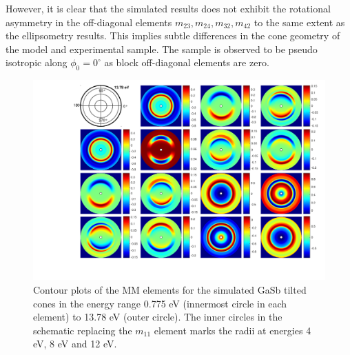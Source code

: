 However, it is clear that the simulated results does not exhibit the rotational asymmetry in the off-diagonal elements $m_{23}, m_{24}, m_{32}, m_{42}$ to the same extent as the ellipsometry results. This implies subtle differences in the cone geometry of the model and experimental sample. The sample is observed to be pseudo isotropic along $\phi_0=0^\circ$ as block off-diagonal elements are zero.

\begin{figure}
    \centering
    \includegraphics[width=\linewidth, trim=3.9cm 2.1cm 0.4cm 0cm, clip]{figures/ch4/gasb/contour/GaSbCones_contour_MM_13point78eV.pdf}
    \caption{Contour plots of the MM elements for the simulated GaSb tilted cones in the energy range 0.775 eV (innermost circle in each element) to 13.78 eV (outer circle). The inner circles in the schematic replacing the $m_{11}$ element marks the radii at energies 4 eV, 8 eV and 12 eV.}
    \label{fig:gasb_contour_MM_full}
\end{figure}
